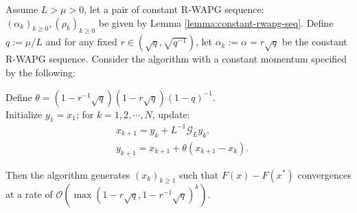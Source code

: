 \documentclass[12pt]{article}
\begin{document}
        \begin{theorem}\label{thm:fixed-momentum-fista}
            Assume $L > \mu > 0$, let a pair of constant R-WAPG sequence: $(\alpha_k)_{k \ge0}, (\rho_k)_{k \ge 0}$ be given by Lemma \ref{lemma:constant-rwapg-seq}.
            Define $q := \mu/L$ and for any fixed $r \in \left(\sqrt{q}, \sqrt{q^{-1}}\right)$, let $\alpha_k := \alpha = r \sqrt{q}$ be the constant R-WAPG sequence. 
            Consider the algorithm with a constant momentum specified by the following: 
            \begin{tcolorbox}
                Define $\theta = \left(1 - r^{-1}\sqrt{q}\right)(1 - r\sqrt{q})(1 - q)^{-1}$. 
                \\
                Initialize $y_1 = x_1$; for $k = 1, 2, \cdots, N$, update: 
                \begin{align*}
                    &x_{k + 1} = y_k + L^{-1}\mathcal G_L y_k, 
                    \\
                    & y_{k + 1} = x_{k + 1} + \theta(x_{k + 1} - x_k). 
                \end{align*}
            \end{tcolorbox}
            Then the algorithm generates $(x_k)_{k \ge 1}$ such that $F(x) - F(x^*)$ convergences at a rate of $\mathcal O\left(\max(1 - r\sqrt{q}, 1 - r^{-1}\sqrt{q})^k\right)$. 
        \end{theorem}

    
\end{document}
